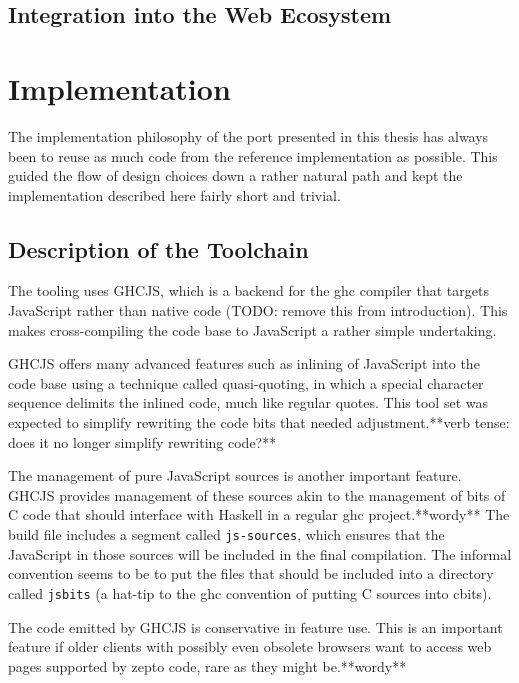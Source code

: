 \documentclass[oneside,11pt,xetex]{scrbook}
\begin{document}
\section{Integration into the Web Ecosystem}


\chapter{Implementation}
\label{chap:Implementation}

The implementation philosophy of the port presented in this thesis has always been to
reuse as much code from the reference implementation as possible. This guided the flow of design
choices down a rather natural path and kept the implementation described here fairly short and trivial.

\section{Description of the Toolchain}

The tooling uses GHCJS, which is a backend for the \gls{ghc} compiler that targets JavaScript rather
than native code (TODO: remove this from introduction). This makes cross-compiling the code base to
JavaScript a rather simple undertaking.

GHCJS offers many advanced features such as inlining of JavaScript into the code
base using a technique called quasi-quoting, in which a special character sequence delimits the
inlined code, much like regular quotes. This tool set was expected to simplify rewriting the code
bits that needed adjustment.**verb tense: does it no longer simplify rewriting code?**

The management of pure JavaScript sources is another important feature. GHCJS provides management
of these sources akin to the management of bits of C code that should interface with Haskell in a
regular \gls{ghc} project.**wordy** The build file includes a segment called \texttt{js-sources}, which ensures
that the JavaScript in those sources will be included in the final compilation. The informal convention
seems to be to put the files that should be included into a directory called \texttt{jsbits} (a hat-tip
to the \gls{ghc} convention of putting C sources into cbits).

The code emitted by GHCJS is conservative in feature use. This is an important feature if older clients
with possibly even obsolete browsers want to access web pages supported by zepto code, rare as they might
be.**wordy**
\end{document}
